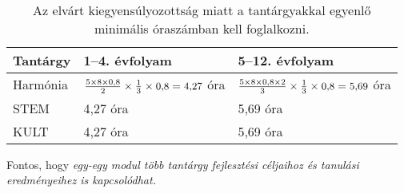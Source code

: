 \begin{table}

  \begin{tabular}{ l|l|l }

    \textbf{\small Tantárgy} & \textbf{\small 1--4. évfolyam}                               & \textbf{\small 5--12. évfolyam}
    \\ \hline
    {\small Harmónia}          & $\frac{5 \times 8 \times 0,8}{2} \times \frac{1}{3}
      \times \hbox{\small 0,8} =
    \hbox{\small 4,27}$ {\small óra}         &
    $\frac{5 \times 8 \times 0,8 \times 2}{3} \times \frac{1}{3} \times \hbox{\small 0,8} =
      \hbox{\small 5,69}$
    {\small óra}
    \\ \hline
    {\small STEM}              & {\small 4,27 óra}
                      & {\small 5,69 óra}                                                                     \\
    \hline
    {\small KULT}              & {\small 4,27 óra}
                      & {\small 5,69 óra}                                                                     \\
    \hline

  \end{tabular}
  \caption{Az elvárt kiegyensúlyozottság miatt a tantárgyakkal egyenlő
    minimális óraszámban kell foglalkozni.}
  \label{tbl:oraszamok}
\end{table}

Fontos, hogy \emph{egy-egy modul több tantárgy fejlesztési céljaihoz és
  tanulási eredményeihez is kapcsolódhat.}